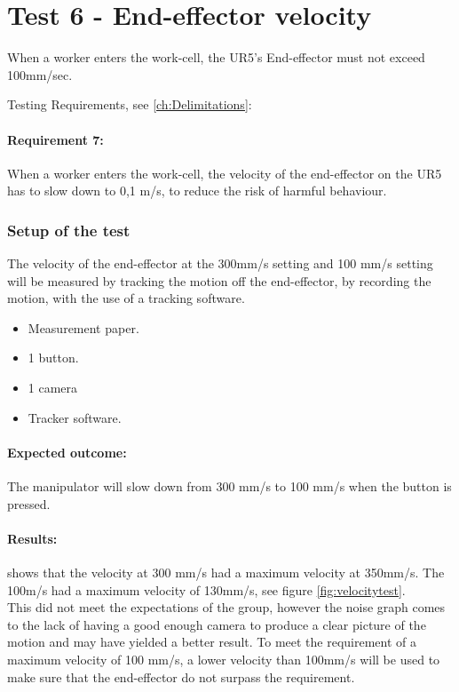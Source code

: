 \section{Test 6 - End-effector velocity}
When a worker enters the work-cell, the UR5's End-effector must not exceed 100mm/sec.

Testing Requirements, see  \ref{ch:Delimitations}:

\paragraph{Requirement 7:} When a worker enters the work-cell, the velocity of the end-effector on the UR5 has to slow down to 0,1 m/s, to reduce the risk of harmful behaviour.\\

\subsubsection{Setup of the test}
The velocity of the end-effector at the  300mm/s setting and 100 mm/s setting will be measured by tracking the motion off the end-effector, by recording the motion, with the use of a tracking software.
\begin{itemize}
    \item Measurement paper.
    \item 1 button.
    \item 1 camera
    \item Tracker software.
\end{itemize}

\paragraph{Expected outcome:}
The manipulator will slow down from 300 mm/s to 100 mm/s when the button is pressed.

\paragraph{Results: }
shows that the velocity at 300 mm/s had a maximum velocity at 350mm/s. The 100m/s had a maximum velocity of 130mm/s, see figure \ref{fig:velocitytest}.\\
This did not meet the expectations of the group, however the noise graph comes to the lack of having a good enough camera to produce a clear picture of the motion and may have yielded a better result. To meet the requirement of a maximum velocity of 100 mm/s, a lower velocity than 100mm/s will be used to make sure that the end-effector do not surpass the requirement.\\ 

